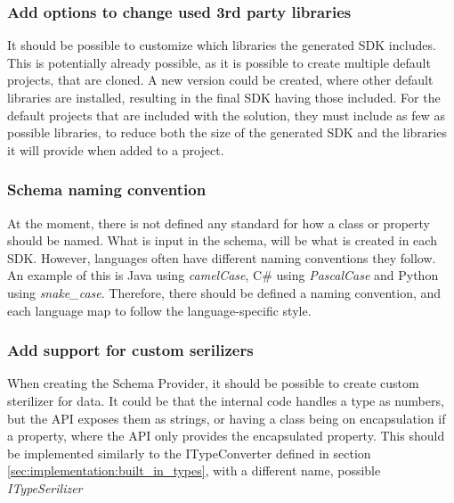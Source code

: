 \subsubsection*{Add options to change used 3rd party libraries}
It should be possible to customize which libraries the generated SDK includes.
This is potentially already possible, as it is possible to create multiple default projects, that are cloned. A new version could be created, where other default libraries are installed, resulting in the final SDK having those included.
For the default projects that are included with the solution, they must include as few as possible libraries, to reduce both the size of the generated SDK and the libraries it will provide when added to a project.

\subsubsection*{Schema naming convention}
At the moment, there is not defined any standard for how a class or property should be named.
What is input in the schema, will be what is created in each SDK.
However, languages often have different naming conventions they follow.
An example of this is Java using \textit{camelCase}, C\# using \textit{PascalCase} and Python using \textit{snake\_case}.
Therefore, there should be defined a naming convention, and each language map to follow the language-specific style.


\subsubsection*{Add support for custom serilizers}
When creating the Schema Provider, it should be possible to create custom sterilizer for data.
It could be that the internal code handles a type as numbers, but the API exposes them as strings, or having a class being on encapsulation if a property, where the API only provides the encapsulated property. This should be implemented similarly to the ITypeConverter defined in section \ref{sec:implementation:built_in_types}, with a different name, possible \textit{ITypeSerilizer}


